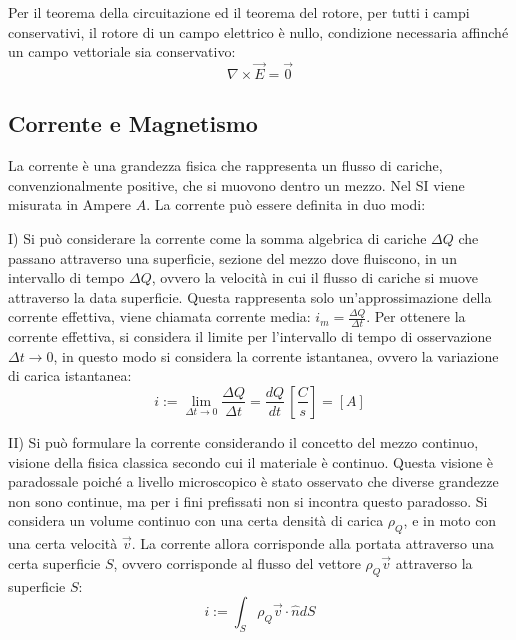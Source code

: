 \documentclass{article}
\numberwithin{equation}{subsection}
\begin{document}
Per il teorema della circuitazione ed il teorema del rotore, per tutti i campi conservativi, il rotore di un campo elettrico è nullo, condizione necessaria affinché un campo 
vettoriale sia conservativo: 
\begin{equation}
    {\nabla}\times\vec{E}=\vec0
\end{equation}

\subsection{Corrente e Magnetismo}

La corrente è una grandezza fisica che rappresenta un flusso di cariche, convenzionalmente positive, che si muovono dentro un mezzo. Nel SI viene misurata in Ampere $A$. 
La corrente può essere definita in duo modi:  


I) Si può considerare la corrente come la somma algebrica di cariche $\Delta Q$ che passano attraverso una superficie, sezione del 
mezzo dove fluiscono, in un intervallo di tempo $\Delta Q$, ovvero la velocità in cui il flusso di cariche si muove attraverso la data superficie. Questa rappresenta solo 
un'approssimazione della corrente effettiva, viene chiamata corrente media: $i_m=\displaystyle\frac{\Delta Q}{\Delta t}$. Per ottenere la corrente effettiva, si considera il 
limite per l'intervallo di tempo di osservazione $\Delta t\to0$, in questo modo si considera la corrente istantanea, ovvero la variazione di carica istantanea:
\begin{equation}
    i:=\lim_{\Delta t\to0}\displaystyle\frac{\Delta Q}{\Delta t}=\frac{dQ}{dt}\,\left[\frac{C}{s}\right]=[A]
\end{equation}  

II) Si può formulare la corrente considerando il concetto del mezzo continuo, visione della fisica classica secondo cui il materiale è continuo. Questa visione è paradossale 
poiché a livello microscopico è stato osservato che diverse grandezze non sono continue, ma per i fini prefissati non si incontra questo paradosso. Si considera un volume 
continuo con una certa densità di carica $\rho_Q$, e in moto con una certa velocità $\vec{v}$. La corrente allora corrisponde alla portata attraverso una certa superficie $S$, 
ovvero corrisponde al flusso del vettore $\rho_Q\vec{v}$ attraverso la superficie $S$: 
\begin{equation}
    i:=\displaystyle\int_S\rho_Q\vec{v}\cdot\hat{n}dS
\end{equation}
\end{document}
